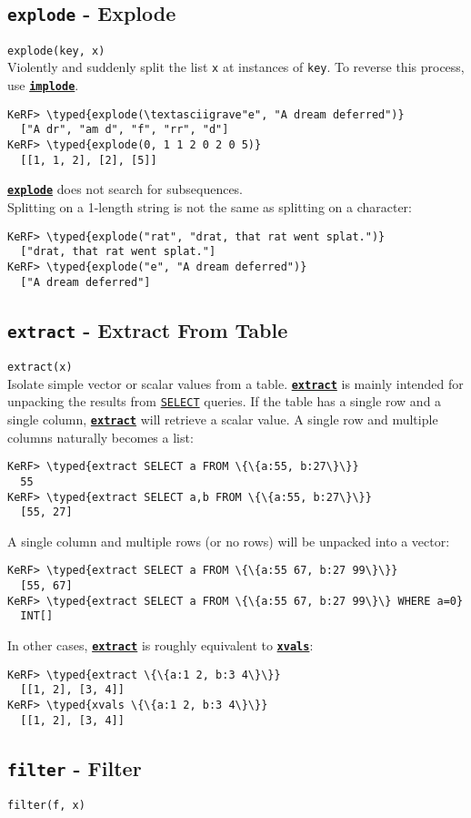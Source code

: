 \documentclass{article}
\newcommand{\typed}[1]{\textcolor{TealBlue}{#1}}
\newcommand{\primdefu}[3]{\subsection{\texttt{#1} - #2}\label{prim:#3}}
\newcommand{\primu}[2]{\hyperref[prim:#2]{\textbf{\texttt{#1}}}}
\newcommand{\primdef}[2]{\primdefu{#1}{#2}{#1}}
\newcommand{\prim}[1]{\primu{#1}{#1}}
\begin{document}
\primdef{explode}{Explode}
\texttt{explode(key, x)}\\

Violently and suddenly split the list \texttt{x} at instances of \texttt{key}. To reverse this process, use \prim{implode}.
\begin{Verbatim}
KeRF> \typed{explode(\textasciigrave"e", "A dream deferred")}
  ["A dr", "am d", "f", "rr", "d"]
KeRF> \typed{explode(0, 1 1 2 0 2 0 5)}
  [[1, 1, 2], [2], [5]]
\end{Verbatim}

\prim{explode} does not search for subsequences.\\Splitting on a 1-length string is not the same as splitting on a character:
\begin{Verbatim}
KeRF> \typed{explode("rat", "drat, that rat went splat.")}
  ["drat, that rat went splat."]
KeRF> \typed{explode("e", "A dream deferred")}
  ["A dream deferred"]
\end{Verbatim}

\pagebreak
\primdef{extract}{Extract From Table}
\texttt{extract(x)}\\

Isolate simple vector or scalar values from a table. \prim{extract} is mainly intended for unpacking the results from \hyperref[sec:select]{\texttt{SELECT}} queries. If the table has a single row and a single column, \prim{extract} will retrieve a scalar value. A single row and multiple columns naturally becomes a list:
\begin{Verbatim}
KeRF> \typed{extract SELECT a FROM \{\{a:55, b:27\}\}}
  55
KeRF> \typed{extract SELECT a,b FROM \{\{a:55, b:27\}\}}
  [55, 27]
\end{Verbatim}

A single column and multiple rows (or no rows) will be unpacked into a vector:
\begin{Verbatim}
KeRF> \typed{extract SELECT a FROM \{\{a:55 67, b:27 99\}\}}
  [55, 67]
KeRF> \typed{extract SELECT a FROM \{\{a:55 67, b:27 99\}\} WHERE a=0}
  INT[]
\end{Verbatim}

In other cases, \prim{extract} is roughly equivalent to \prim{xvals}:
\begin{Verbatim}
KeRF> \typed{extract \{\{a:1 2, b:3 4\}\}}
  [[1, 2], [3, 4]]
KeRF> \typed{xvals \{\{a:1 2, b:3 4\}\}}
  [[1, 2], [3, 4]]
\end{Verbatim}

\primdef{filter}{Filter}
\texttt{filter(f, x)}\\
\end{document}
